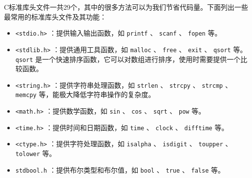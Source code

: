 C标准库头文件一共29个，其中的很多方法可以为我们节省代码量。下面列出一些最常用的标准库头文件及其功能：
\begin{itemize}
    \item \verb|<stdio.h>| ：提供输入输出函数，如 \verb|printf| 、 \verb|scanf| 、 \verb|fopen| 等。
    \item \verb|<stdlib.h>| ：提供通用工具函数，如 \verb|malloc| 、 \verb|free| 、 \verb|exit| 、 \verb|qsort| 等。\verb|qsort| 是一个快速排序函数，它可以对数组进行排序，使用时需要提供一个比较函数。
    \item \verb|<string.h>| ：提供字符串处理函数，如 \verb|strlen| 、 \verb|strcpy| 、 \verb|strcmp| 、 \verb|memcpy| 等，能极大降低字符串操作的复杂度。
    \item \verb|<math.h>| ：提供数学函数，如 \verb|sin| 、 \verb|cos| 、 \verb|sqrt| 、 \verb|pow| 等。
    \item \verb|<time.h>| ：提供时间和日期函数，如 \verb|time| 、 \verb|clock| 、 \verb|difftime| 等。
    \item \verb|<ctype.h>| ：提供字符处理函数，如 \verb|isalpha| 、 \verb|isdigit| 、 \verb|toupper| 、 \verb|tolower| 等。
    \item \verb|stdbool.h| ：提供布尔类型和布尔值，如 \verb|bool| 、 \verb|true| 、 \verb|false| 等。
\end{itemize}